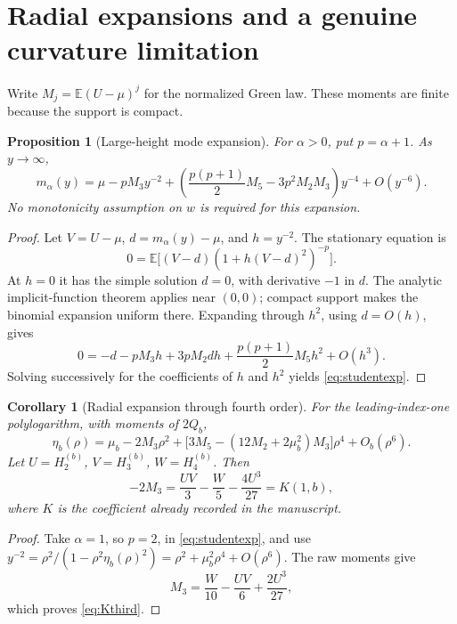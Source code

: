 \documentclass[11pt]{article}
\numberwithin{equation}{section}
\newtheorem{proposition}[theorem]{Proposition}
\newtheorem{corollary}[theorem]{Corollary}
\theoremstyle{definition}
\theoremstyle{remark}
\newcommand{\E}{\mathbb E}
\begin{document}
\section{Radial expansions and a genuine curvature limitation}
\label{sec:expansion}
Write $M_j=\E(U-\mu)^j$ for the normalized Green law. These moments
are finite because the support is compact.

\begin{proposition}[Large-height mode expansion]\label{prop:mode-expansion}
For $\alpha>0$, put $p=\alpha+1$. As $y\to\infty$,
\begin{equation}\label{eq:studentexp}
 m_\alpha(y)=\mu-pM_3y^{-2}
   +\left(\frac{p(p+1)}2M_5-3p^2M_2M_3\right)y^{-4}
   +O(y^{-6}).
\end{equation}
No monotonicity assumption on $w$ is required for this expansion.
\end{proposition}
\begin{proof}
Let $V=U-\mu$, $d=m_\alpha(y)-\mu$, and $h=y^{-2}$. The stationary
equation is
\[
 0=\E\big[(V-d)(1+h(V-d)^2)^{-p}\big].
\]
At $h=0$ it has the simple solution $d=0$, with derivative $-1$ in
$d$. The analytic implicit-function theorem applies near $(0,0)$;
compact support makes the binomial expansion uniform there.
Expanding through $h^2$, using $d=O(h)$, gives
\[
 0=-d-pM_3h+3pM_2dh+\frac{p(p+1)}2M_5h^2+O(h^3).
\]
Solving successively for the coefficients of $h$ and $h^2$ yields
\eqref{eq:studentexp}.
\end{proof}

\begin{corollary}[Radial expansion through fourth order]
\label{cor:radialexp}
For the leading-index-one polylogarithm, with moments of $2Q_b$,
\begin{equation}\label{eq:etaexp}
 \eta_b(\rho)=\mu_b-2M_3\rho^2
 +\bigl[3M_5-(12M_2+2\mu_b^2)M_3\bigr]\rho^4+O_b(\rho^6).
\end{equation}
Let $U=H_2^{(b)}$, $V=H_3^{(b)}$, $W=H_4^{(b)}$. Then
\begin{equation}\label{eq:Kthird}
 -2M_3=\frac{UV}{3}-\frac W5-\frac{4U^3}{27}=K(1,b),
\end{equation}
where $K$ is the coefficient already recorded in the manuscript.
\end{corollary}
\begin{proof}
Take $\alpha=1$, so $p=2$, in \eqref{eq:studentexp}, and use
$y^{-2}=\rho^2/(1-\rho^2\eta_b(\rho)^2)
=\rho^2+\mu_b^2\rho^4+O(\rho^6)$.
The raw moments give
\[
 M_3=\frac W{10}-\frac{UV}{6}+\frac{2U^3}{27},
\]
which proves \eqref{eq:Kthird}.
\end{proof}
\end{document}
